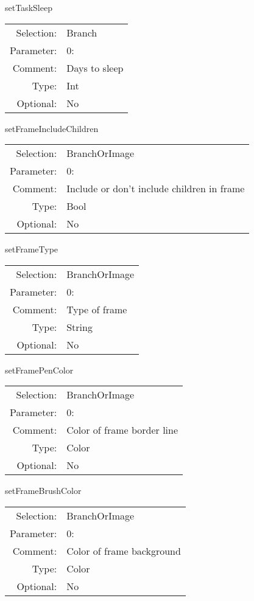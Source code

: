 \item setTaskSleep\\
\begin{tabular}{rl}
  Selection: & Branch\\
   Parameter: &  0:\\
        Comment: & Days to sleep\\
           Type: & Int\\
       Optional: &  No\\
\end{tabular}

\item setFrameIncludeChildren\\
\begin{tabular}{rl}
  Selection: & BranchOrImage\\
   Parameter: &  0:\\
        Comment: & Include or don't include children in frame\\
           Type: & Bool\\
       Optional: &  No\\
\end{tabular}

\item setFrameType\\
\begin{tabular}{rl}
  Selection: & BranchOrImage\\
   Parameter: &  0:\\
        Comment: & Type of frame\\
           Type: & String\\
       Optional: &  No\\
\end{tabular}

\item setFramePenColor\\
\begin{tabular}{rl}
  Selection: & BranchOrImage\\
   Parameter: &  0:\\
        Comment: & Color of frame border line\\
           Type: & Color\\
       Optional: &  No\\
\end{tabular}

\item setFrameBrushColor\\
\begin{tabular}{rl}
  Selection: & BranchOrImage\\
   Parameter: &  0:\\
        Comment: & Color of frame background\\
           Type: & Color\\
       Optional: &  No\\
\end{tabular}

